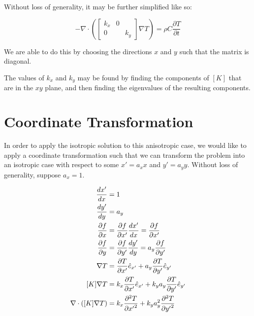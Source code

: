 Without loss of generality, it may be further simplified like so:

\begin{equation}
-\nabla \cdot \left(\begin{bmatrix}k_x & 0\\ 0 && k_y\end{bmatrix}\nabla T \right)= \rho C\frac{\partial T}{\partial t}
\end{equation}

We are able to do this by choosing the directions \(x\) and \(y\) such that the matrix is diagonal.

The values of \(k_x\) and \(k_y\) may be found by finding the components of \([K]\) that are in the \(xy\) plane, and then finding the eigenvalues of the resulting components. 


\section{Coordinate Transformation}
\label{sec:analytical-np:transformation}

In order to apply the isotropic solution to this anisotropic case, we would like to apply a coordinate transformation such that we can transform the problem into an isotropic case with respect to some \(x' = a_x x\) and \(y' = a_y y\). Without loss of generality, suppose \(a_x = 1\).

\begin{align}
\frac{dx'}{dx} &= 1\\
\frac{dy'}{dy} &= a_y\\
\frac{\partial f}{\partial x} &= \frac{\partial f}{\partial x'}\frac{dx'}{dx} = \frac{\partial f}{\partial x'}\\
\frac{\partial f}{\partial y} &= \frac{\partial f}{\partial y'}\frac{dy'}{dy} = a_y\frac{\partial f}{\partial y'}\\
\nabla T &= \frac{\partial T}{\partial x'} \hat{e}_{x'} + a_y\frac{\partial T}{\partial y'} \hat{e}_{y'} \\
[K]\nabla T &= k_x\frac{\partial T}{\partial x'} \hat{e}_{x'} + k_ya_y\frac{\partial T}{\partial y'} \hat{e}_{y'}\\
\nabla \cdot \left([K]\nabla T\right) &= k_x\frac{\partial^2 T}{\partial {x'}^2} + k_ya_y^2\frac{\partial^2 T}{\partial {y'}^2}\\
\end{align}

